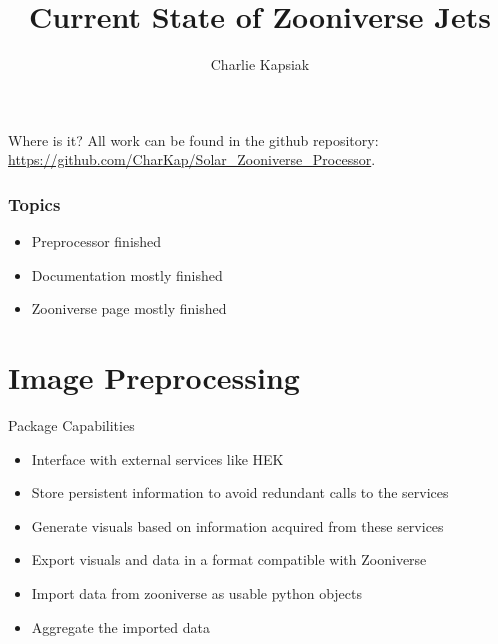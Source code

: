 \documentclass{beamer}
\title{Current State of Zooniverse Jets}
\author{Charlie Kapsiak}
\begin{document}
\frame{\titlepage}

\begin{frame}{Where is it?}
    All work can be found in the github repository: \url{https://github.com/CharKap/Solar_Zooniverse_Processor}.
\end{frame}

\begin{frame}
    \frametitle{Topics}
    \begin{itemize}[<+->]
        \item Preprocessor finished
        \item Documentation mostly finished
        \item Zooniverse page mostly finished
    \end{itemize}
\end{frame}

\section{Image Preprocessing}%

\begin{frame}{Package Capabilities}
    \begin{itemize}
        \item    Interface with external services like HEK
        \item    Store persistent information to avoid redundant calls to the services
        \item    Generate visuals based on information acquired from these services
        \item    Export visuals and data in a format compatible with Zooniverse
        \item    Import data from zooniverse as usable python objects
        \item    Aggregate the imported data
    \end{itemize} 
\end{frame}
\end{document}
